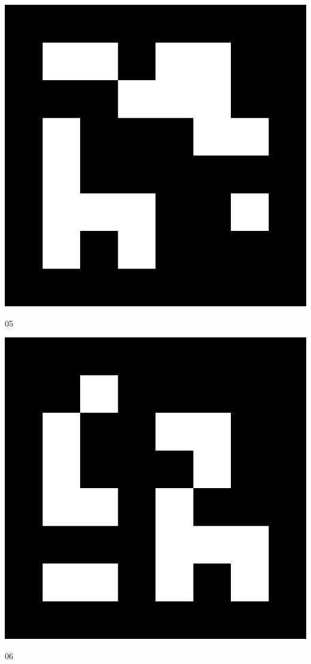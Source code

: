 \newpage
\myemptypage
\vspace{5cm}
\begin{center}
\includegraphics[width=\textwidth, keepaspectratio]{aruco_05.png}
\caption{05}
\end{center}
\newpage
\myemptypage
\vspace{5cm}
\begin{center}
\includegraphics[width=\textwidth, keepaspectratio]{aruco_06.png}
\caption{06}
\end{center}
